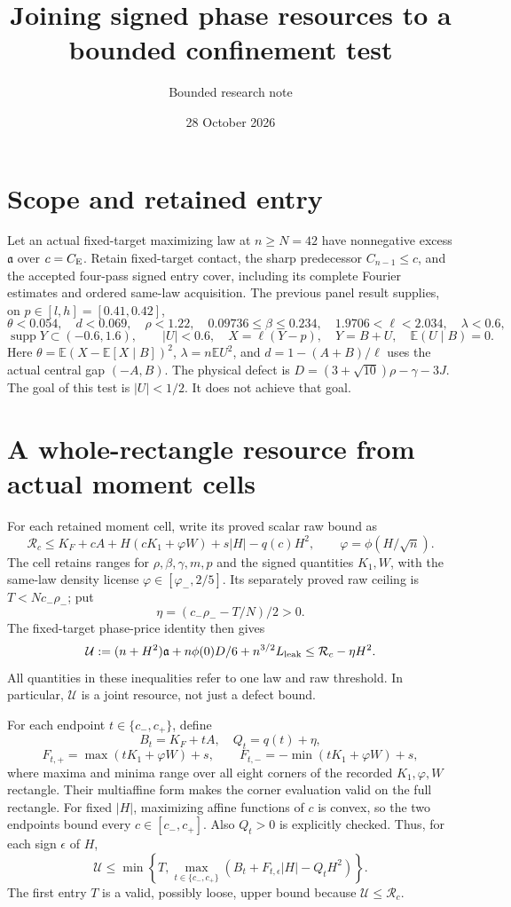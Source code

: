 \documentclass[11pt]{article}
\title{Joining signed phase resources to a bounded confinement test}
\author{Bounded research note}\date{28 October 2026}
\newcommand{\E}{\mathbb E}\newcommand{\CE}{C_{\rm E}}
\begin{document}
\maketitle

\section{Scope and retained entry}
Let an actual fixed-target maximizing law at $n\ge N=42$ have
nonnegative excess $\mathfrak a$ over $c=\CE$. Retain fixed-target contact,
the sharp predecessor $C_{n-1}\le c$, and the accepted four-pass signed
entry cover, including its complete Fourier estimates and ordered
same-law acquisition. The previous panel result supplies, on
$p\in[l,h]=[0.41,0.42]$,
\[
 \theta<0.054,\quad d<0.069,\quad \rho<1.22,
 \quad0.09736\le\beta\le0.234,\quad
 1.9706<\ell<2.034,\quad\lambda<0.6,
\]
\[
 \operatorname{supp}Y\subset(-0.6,1.6),\qquad |U|<0.6,
 \quad X=\ell(Y-p),\quad Y=B+U,\quad\E(U\mid B)=0.
\]
Here $\theta=\E(X-\E[X\mid B])^2$, $\lambda=n\E U^2$, and
$d=1-(A+B)/\ell$ uses the actual central gap $(-A,B)$.
The physical defect is $D=(3+\sqrt{10})\rho-\gamma-3J$.
The goal of this test is $|U|<1/2$. It does not achieve that goal.

\section{A whole-rectangle resource from actual moment cells}
For each retained moment cell, write its proved scalar raw bound as
\begin{equation}\label{pc:raw}
 \mathcal R_c\le K_F+cA+H(cK_1+\varphi W)+s|H|-q(c)H^2,
 \qquad \varphi=\phi(H/\sqrt n).
\end{equation}
The cell retains ranges for $\rho,\beta,\gamma,m,p$ and the signed
quantities $K_1,W$, with the same-law density license
$\varphi\in[\varphi_-,2/5]$. Its separately proved raw ceiling is
$T<Nc_-\rho_-$; put
\[
 \eta=(c_-\rho_- -T/N)/2>0.
\]
The fixed-target phase-price identity then gives
\begin{equation}\label{pc:resource}
 \mathcal U:=(n+H^2)\mathfrak a+n\phi(0)D/6+n^{3/2}L_{\rm leak}
 \le \mathcal R_c-\eta H^2.
\end{equation}
All quantities in these inequalities refer to one law and raw threshold.
In particular, $\mathcal U$ is a joint resource, not just a defect bound.

For each endpoint $t\in\{c_-,c_+\}$, define
\[
 B_t=K_F+tA,\quad Q_t=q(t)+\eta,
\]
\[
 F_{t,+}=\max(tK_1+\varphi W)+s,\qquad
 F_{t,-}=-\min(tK_1+\varphi W)+s,
\]
where maxima and minima range over all eight corners of the recorded
$K_1,\varphi,W$ rectangle. Their multiaffine form makes the corner
evaluation valid on the full rectangle. For fixed $|H|$, maximizing
affine functions of $c$ is convex, so the two endpoints bound every
$c\in[c_-,c_+]$. Also $Q_t>0$ is explicitly checked.
Thus, for each sign $\epsilon$ of $H$,
\begin{equation}\label{pc:cell}
 \mathcal U\le
 \min\left\{T,\max_{t\in\{c_-,c_+\}}
             (B_t+F_{t,\epsilon}|H|-Q_tH^2)\right\}.
\end{equation}
The first entry $T$ is a valid, possibly loose, upper bound because
$\mathcal U\le\mathcal R_c$.
\end{document}
